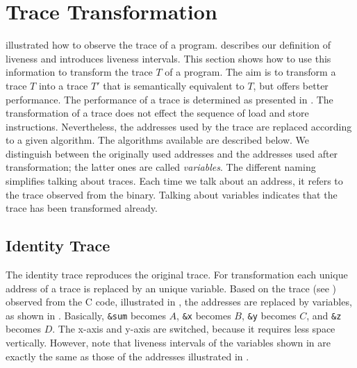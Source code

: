 \documentclass[onecolumn, openright, master, english, signatures]{dbrgrptt}
\begin{document}

\section{Trace Transformation}\label{sec:trace-transformation}

 illustrated how to observe the \ac{trace} of a program.
 describes our definition of liveness and introduces liveness intervals.
This section shows how to use this information to transform the \ac{trace} $T$ of a program.
The aim is to transform a \ac{trace} $T$ into a \ac{trace} $T'$ that is semantically equivalent to $T$, but offers better performance.
The performance of a \ac{trace} is determined as presented in .
The transformation of a \ac{trace} does not effect the sequence of load and store instructions.
Nevertheless, the addresses used by the \ac{trace} are replaced according to a given algorithm.
The algorithms available are described below.
We distinguish between the originally used addresses and the addresses used after transformation; the latter ones are called \emph{variables}.
The different naming simplifies talking about \ac{trace}s.
Each time we talk about an address, it refers to the \ac{trace} observed from the binary.
Talking about variables indicates that the \ac{trace} has been transformed already.

\subsection{Identity Trace}

The identity trace reproduces the original \ac{trace}.
For transformation each unique address of a \ac{trace} is replaced by an unique variable.
Based on the \ac{trace} (see ) observed from the C code, illustrated in , the addresses are replaced by variables, as shown in .
Basically, \texttt{\&sum} becomes $A$, \texttt{\&x} becomes $B$, \texttt{\&y} becomes $C$, and \texttt{\&z} becomes $D$.
The x-axis and y-axis are switched, because it requires less space vertically.
However, note that liveness intervals of the variables shown in  are exactly the same as those of the addresses illustrated in .
\end{document}
